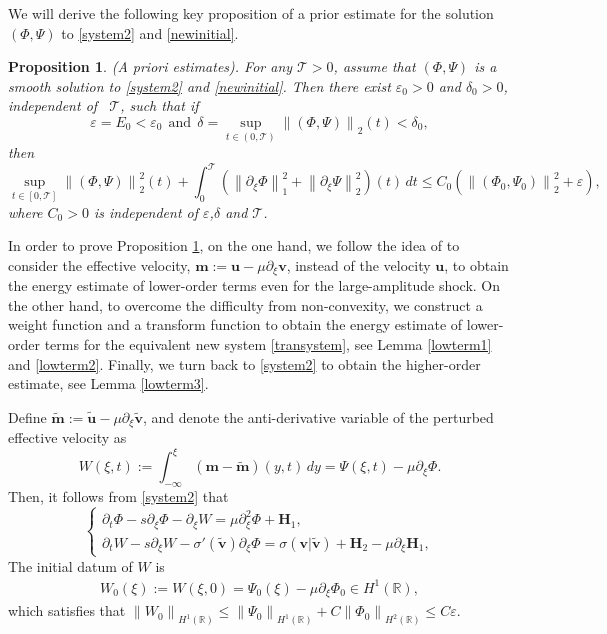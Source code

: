 \documentclass[12pt,reqno]{amsart}
\numberwithin{equation}{section}
\newcommand{\norm}[1]{\left\lVert #1 \right\rVert}
\def\p{\partial}
\def\R{\mathbb{R}}
\def\T{\mathcal{T}}
\newtheorem{proposition}[theorem]{Proposition}
\begin{document}
We will derive the following key proposition of a prior estimate for the solution $(\Phi,\Psi)$ to \eqref{system2} and \eqref{newinitial}. 
\begin{proposition}\label{mainpro}
	(A priori estimates). For any $\T>0$, assume that $(\Phi,\Psi)$ is a smooth solution to \eqref{system2} and \eqref{newinitial}. Then there
	exist $\varepsilon_0>0$ and $\delta_0>0$, independent of ~$\T$, such that if 
	\begin{equation}\label{initialsmall}
		\varepsilon=E_0<\varepsilon_0~~\text{and}~~\delta=\mathop{sup}\limits_{t \in (0,\T)}\norm{(\Phi,\Psi)}_2(t)<\delta_0,
	\end{equation}
	then
	\begin{equation}\label{proesti}
		\mathop{sup}\limits_{t \in [0,\T]}\norm{(\Phi,\Psi)}^2_2(t)+\int_{0}^{\T}(\norm{\p_{\xi}\Phi}^2_1+\norm{\p_{\xi}\Psi}^2_2)(t)  \,dt\leq C_0
		(\norm{(\Phi_0,\Psi_0)}^2_2+\varepsilon),
	\end{equation}
	where $C_0>0$ is independent of $\varepsilon$,$\delta$ and $\T$.
\end{proposition}
In order to prove Proposition \ref{mainpro}, on the one hand, we
follow the idea of \cite{Yao.2016, HehuangJDE, HuangYuanCMP}to consider the effective velocity, $\mathbf{m}:=\mathbf{u}-\mu \p_{\xi}\mathbf{v}$, instead of 
the velocity $\mathbf{u}$, to obtain the energy estimate of lower-order terms even for the large-amplitude shock. On the other hand, to overcome the difficulty from non-convexity, we construct
a weight function and a transform function to obtain the energy estimate of lower-order terms for the equivalent new system \eqref{transystem}, see Lemma \ref{lowterm1} and \ref{lowterm2}. Finally, we turn back to \eqref{system2} 
to obtain the higher-order estimate, see Lemma \ref{lowterm3}.

Define $\mathbf{\tilde{m}}:=\mathbf{\tilde{u}}-\mu \p_{\xi}\mathbf{\tilde{v}}$, and denote the anti-derivative variable of the perturbed effective velocity as
\begin{equation}\label{w}
	W(\xi,t):=\int_{-\infty}^{\xi}(\mathbf{m}-\mathbf{\tilde{m}})(y,t)  \,dy =\Psi(\xi,t)-\mu \p_{\xi}\Phi.
\end{equation}
Then, it follows from \eqref{system2} that
\begin{equation}\label{mainsystem}
	\begin{cases}
		\p_t\Phi-s\p_{\xi}\Phi-\p_{\xi}W=\mu \p^2_{\xi}\Phi + \mathbf{H}_1,\\
		\p_tW-s\p_{\xi}W-\sigma'(\mathbf{\tilde{v}})\p_{\xi}\Phi=\sigma(\mathbf{v}|\mathbf{\tilde{v}})+\mathbf{H}_2-\mu \p_{\xi}\mathbf{H}_1,
	\end{cases}
\end{equation}
The initial datum of $W$ is 
\begin{align*}
	W_0(\xi):=W(\xi,0)=\Psi_0(\xi)-\mu\p_\xi \Phi_0 \in H^1(\R),
\end{align*}
which satisfies that $\norm{W_0}_{H^1(\R)}\leq \norm{\Psi_0}_{H^1(\R)}+C\norm{\Phi_0}_{H^2(\R)} \leq C\varepsilon$.
\end{document}
